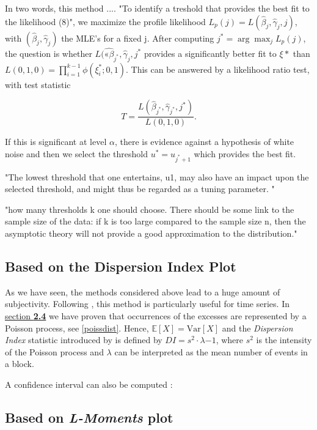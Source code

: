 \documentclass[11pt,a4paper,openany ]{book}
\newcommand{\argmaxD}{\arg\!\max} %
\begin{document}
In two words, this method ....
"To identify a treshold that provides the best fit to the likelihood (8)", we maximize the profile likelihood $L_p(j)=L(\hat{\beta}_j,\hat{\gamma}_j,j)$, with $(\hat{\beta}_j,\hat{\gamma}_j)$ the MLE's for a fixed j. After computing $j^*=\argmaxD_j L_p(j)$, the question is whether $L(\hat{«\beta}_{j^*},\hat{\gamma}_j,j^*$ provides a significantly better fit to $\xi*$ than $L(0,1,0)=\prod_{i=1}^{k-1}\phi(\xi_i^*;0,1)$. This can be answered by a likelihood ratio test, with test statistic 

\begin{equation}
T=\frac{L(\hat{\beta}_{j^*},\hat{\gamma}_{j^*},j^*)}{L(0,1,0)}.
\end{equation}

If this is significant at level $\alpha$, there is evidence against a hypothesis of white noise and then we select the threshold $u^*=u_{j^*+1}$ which provides the best fit.

"The lowest threshold that one entertains, u1, may also
have an impact upon the selected threshold, and might thus be
regarded as a tuning parameter. "

"how many thresholds k one
should choose. There should be some link to the sample size of
the data: if k is too large compared to the sample size n, then the
asymptotic theory will not provide a good approximation to the
distribution."



\subsection*{Based on the Dispersion Index Plot}

As we have seen, the methods considered above lead to a huge amount of subjectivity.
Following \citet{ribatet_users_2006}, this method is particularly useful for time series. In \hyperref[poissonproc]{section \textbf{2.4}} we have proven that occurrences of the excesses are represented by a Poisson process, see \ref{poissdist}. Hence, $\mathbb{E}[X]=\text{Var}[X]$ and the \emph{Dispersion Index} statistic introduced by \cite{cunnane_note_1979} is 
defined by $DI=s^2\cdot\lambda{-1}$, where $s^2$ is the intensity of the Poisson process and $\lambda$ can be interpreted as the mean number of events in a block.

A confidence interval can also be computed :

\subsection*{Based on \emph{L-Moments} plot}
\end{document}
